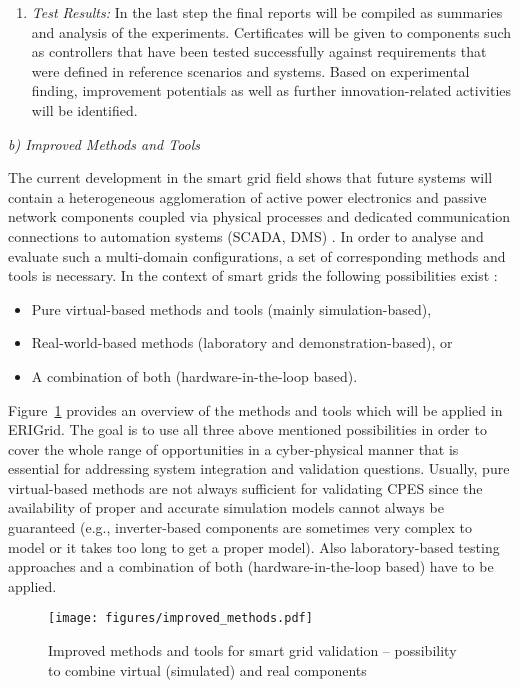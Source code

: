 \documentclass[runningheads,a4paper]{llncs}
\begin{document}
\begin{enumerate}
	\item \textit{Test Results:} In the last step the final reports will be compiled as summaries and analysis of the experiments. Certificates will be given to components such as controllers that have been tested successfully against requirements that were defined in reference scenarios and systems. Based on experimental finding, improvement potentials as well as further innovation-related activities will be identified.
\end{enumerate}

\noindent\textit{b) Improved Methods and Tools\\[-0.5em]}

\noindent The current development in the smart grid field shows that future systems will contain a heterogeneous agglomeration of active power electronics and passive network components coupled via physical processes and dedicated communication connections to automation systems (SCADA, DMS) \cite{Strasser:2017}. In order to analyse and evaluate such a multi-domain configurations, a set of corresponding methods and tools is necessary. In the context of smart grids the following possibilities exist \cite{Strasser:2017}:

\begin{itemize}
	\item Pure virtual-based methods and tools (mainly simulation-based),
	\item Real-world-based methods (laboratory and demonstration-based), or
	\item A combination of both (hardware-in-the-loop based).
\end{itemize}

Figure~\ref{fig:improved_methods} provides an overview of the methods and tools which will be applied in ERIGrid. The goal is to use all three above mentioned possibilities in order to cover the whole range of opportunities in a cyber-physical manner that is essential for addressing system integration and validation questions. Usually, pure virtual-based methods are not always sufficient for validating CPES since the availability of proper and accurate simulation models cannot always be guaranteed (e.g., inverter-based components are sometimes very complex to model or it takes too long to get a proper model). Also laboratory-based testing approaches and a combination of both (hardware-in-the-loop based) have to be applied. 

\begin{figure}[!htbp]
	\centering
	\texttt{[image: figures/improved\_methods.pdf]}
	\caption{Improved methods and tools for smart grid validation -- possibility to combine virtual (simulated) and real components \cite{Strasser:2017}
	}
	\label{fig:improved_methods}
\end{figure}
\end{document}
